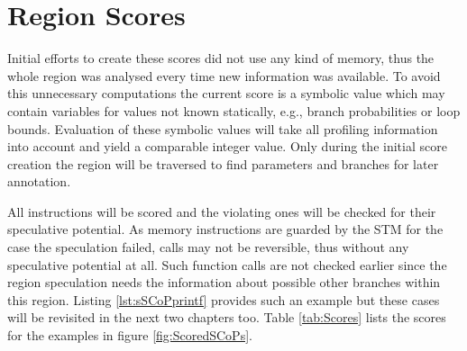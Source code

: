 \section{Region Scores}
Initial efforts to create these scores did not use any kind of 
memory, thus the whole region was analysed every time new information was available.
To avoid this unnecessary computations the current score is a
symbolic value which may contain variables for values not known statically, e.g.,
branch probabilities or loop bounds.
Evaluation of these symbolic values will take all profiling 
information into account and yield a comparable integer value. 
Only during the initial score creation the region will be traversed to find
parameters and branches for later annotation. 

All instructions will be scored and the violating ones
will be checked for their speculative potential.
As memory instructions are 
guarded by the STM for the case the speculation failed, calls may not be
reversible, thus without any speculative potential at all. Such function calls
are not checked earlier since the region speculation needs the information about
possible other branches within this region. 
Listing \ref{lst:sSCoPprintf} 
provides such an example but these cases will be revisited in the next 
two chapters too. Table \ref{tab:Scores} lists the scores for the examples in 
figure \ref{fig:ScoredSCoPs}.

